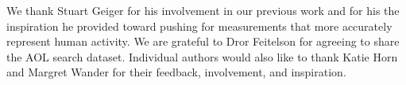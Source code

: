 We thank Stuart Geiger for his involvement in our previous work and for his the inspiration he provided toward pushing for measurements that more accurately represent human activity.  We are grateful to Dror Feitelson for agreeing to share the AOL search dataset. Individual authors would also like to thank Katie Horn and Margret Wander for their feedback, involvement, and inspiration.
